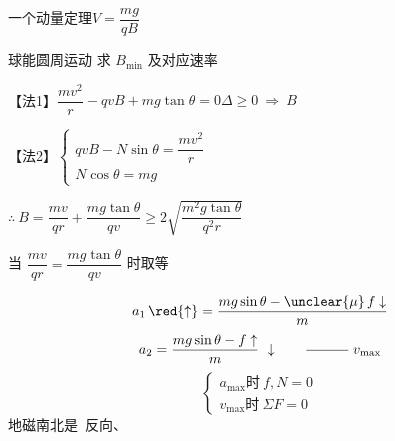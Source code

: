 一个动量定理\quad $V=\dfrac{mg}{qB}$
\begin{problem}[2]


球能圆周运动 求 $B_{\min}$ 及对应速率
\begin{solution}
【法1】\quad $\dfrac{mv^2}{r}-qvB+mg\tan\theta=0$\qquad $\Delta\ge0\ \Rightarrow\ B$

【法2】\quad $\left\{\begin{array}{l}qvB-N\sin\theta=\dfrac{mv^2}{r}\\[2mm] N\cos\theta=mg\end{array}\right.$

$\therefore\ B=\dfrac{mv}{qr}+\dfrac{mg\tan\theta}{qv}\ge2\sqrt{\dfrac{m^2g\tan\theta}{q^2r}}$ %

当 $\dfrac{mv}{qr}=\dfrac{mg\tan\theta}{qv}$ 时取等
\end{solution}
\end{problem}
\[ a_1\,\red{\uparrow}=\dfrac{mg\sin\theta-\unclear{\mu}\,f\downarrow}{m} \]
\[ a_2=\dfrac{mg\sin\theta-f\uparrow}{m}\ \downarrow\qquad \rule[0.5ex]{3em}{0.4pt}\ v_{\max} \]
\[ \left\{\begin{array}{l} a_{\max}\text{时}\ f,N=0\\[2pt] v_{\max}\text{时}\ \Sigma F=0 \end{array}\right. \]
地磁南北是\ 反向、

